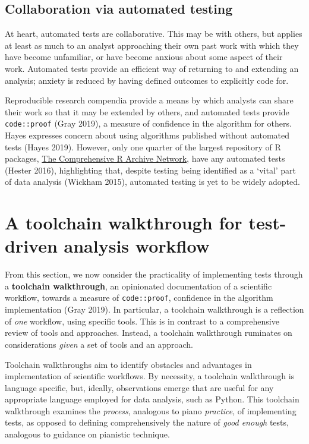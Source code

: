 \documentclass[
]{article}
\begin{document}
\hypertarget{collaboration-via-automated-testing}{%
\subsection{Collaboration via automated testing}\label{collaboration-via-automated-testing}}

At heart, automated tests are collaborative. This may be with others, but applies at least as much to an analyst approaching their own past work with which they have become unfamiliar, or have become anxious about some aspect of their work. Automated tests provide an efficient way of returning to and extending an analysis; anxiety is reduced by having defined outcomes to explicitly code for.

Reproducible research compendia provide a means by which analysts can share their work so that it may be extended by others, and automated tests provide \texttt{code::proof} (Gray 2019), a measure of confidence in the algorithm for others. Hayes expresses concern about using algorithms published without automated tests (Hayes 2019). However, only one quarter of the largest repository of R packages, \href{https://cran.r-project.org/}{The Comprehensive R Archive Network}, have any automated tests (Hester 2016), highlighting that, despite testing being identified as a `vital' part of data analysis (Wickham 2015), automated testing is yet to be widely adopted.

\hypertarget{a-toolchain-walkthrough-for-test-driven-analysis-workflow}{%
\section{A toolchain walkthrough for test-driven analysis workflow}\label{a-toolchain-walkthrough-for-test-driven-analysis-workflow}}

From this section, we now consider the practicality of implementing tests through a \textbf{toolchain walkthrough}, an opinionated documentation of a scientific workflow, towards a measure of \texttt{code::proof}, confidence in the algorithm implementation (Gray 2019). In particular, a toolchain walkthrough is a reflection of \emph{one} workflow, using specific tools. This is in contrast to a comprehensive review of tools and approaches. Instead, a toolchain walkthrough ruminates on considerations \emph{given} a set of tools and an approach.

Toolchain walkthroughs aim to identify obstacles and advantages in implementation of scientific workflows. By necessity, a toolchain walkthrough is language specific, but, ideally, observations emerge that are useful for any appropriate language employed for data analysis, such as Python. This toolchain walkthrough examines the \emph{process}, analogous to piano \emph{practice}, of implementing tests, as opposed to defining comprehensively the nature of \emph{good enough} tests, analogous to guidance on pianistic technique.
\end{document}
